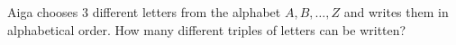 Aiga chooses $3$ different letters from the alphabet $A,B,\dots,Z$ and writes them in alphabetical order. How many different triples of letters can be written?
